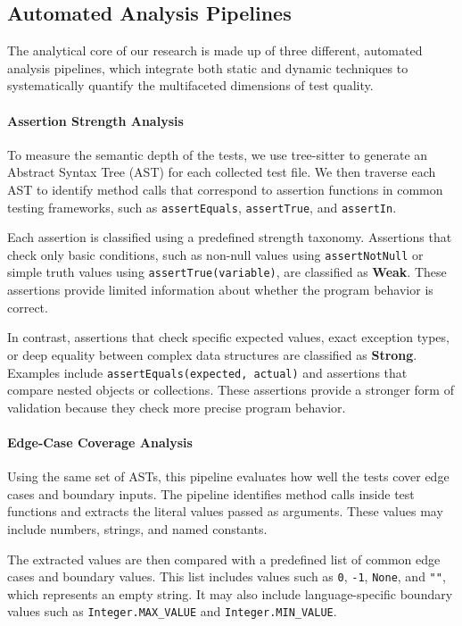 \documentclass[conference]{IEEEtran}
\begin{document}
\subsection{Automated Analysis Pipelines}
\label{ssec:data-analysis}
The analytical core of our research is made up of three different, automated analysis pipelines, which integrate both static and dynamic techniques to systematically quantify the multifaceted dimensions of test quality.

\paragraph{\textbf{Assertion Strength Analysis}}
To measure the semantic depth of the tests, we use tree-sitter to generate an Abstract Syntax Tree (AST) for each collected test file. We then traverse each AST to identify method calls that correspond to assertion functions in common testing frameworks, such as \texttt{assertEquals}, \texttt{assertTrue}, and \texttt{assertIn}.

Each assertion is classified using a predefined strength taxonomy. Assertions that check only basic conditions, such as non-null values using \texttt{assertNotNull} or simple truth values using \texttt{assertTrue(variable)}, are classified as \textbf{Weak}. These assertions provide limited information about whether the program behavior is correct.

In contrast, assertions that check specific expected values, exact exception types, or deep equality between complex data structures are classified as \textbf{Strong}. Examples include \texttt{assertEquals(expected, actual)} and assertions that compare nested objects or collections. These assertions provide a stronger form of validation because they check more precise program behavior.
    
\paragraph{\textbf{Edge-Case Coverage Analysis}}
Using the same set of ASTs, this pipeline evaluates how well the tests cover edge cases and boundary inputs. The pipeline identifies method calls inside test functions and extracts the literal values passed as arguments. These values may include numbers, strings, and named constants.

The extracted values are then compared with a predefined list of common edge cases and boundary values. This list includes values such as \texttt{0}, \texttt{-1}, \texttt{None}, and \texttt{""}, which represents an empty string. It may also include language-specific boundary values such as \texttt{Integer.MAX\_VALUE} and \texttt{Integer.MIN\_VALUE}.
\end{document}

